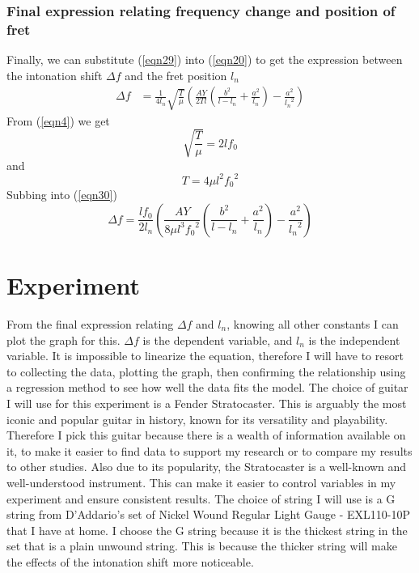 \documentclass[11pt]{article}
\begin{document}
\begin{flushleft}
            \subsubsection*{Final expression relating frequency change and position of fret}
                Finally, we can substitute (\ref{eqn29}) into (\ref{eqn20}) to get the expression between the intonation shift $\Delta f$ and the fret position $l_n$
                \begin{align}
                    \Delta f &= \frac{1}{4l_n} \sqrt{\frac{T}{\mu}} \left( \frac{AY}{2Tl} \left( \frac{b^2}{l-l_n} + \frac{a^2}{l_n} \right) - \frac{a^2}{{l_n}^2} \right) \label{eqn30}
                \end{align}
                From (\ref{eqn4}) we get
                \begin{equation*}
                    \sqrt{\frac{T}{\mu}} = 2lf_0
                \end{equation*}
                and 
                \begin{equation*}
                    T = 4\mu l^2{f_0}^2    
                \end{equation*}
                Subbing into (\ref{eqn30})
                \begin{equation}
                    \Delta f = \frac{l f_0}{2l_n} \left( \frac{AY}{8\mu l^3 {f_0}^2} \left( \frac{b^2}{l-l_n} + \frac{a^2}{l_n} \right) - \frac{a^2}{{l_n}^2} \right) \label{eqn31}
                \end{equation}
                

    \section{Experiment}
        From the final expression relating $\Delta f$ and $l_n$, knowing all other constants I can plot the graph for this. $\Delta f$ is the dependent variable, and $l_n$ is the independent variable. It is impossible to linearize the equation, therefore I will have to resort to collecting the data, plotting the graph, then confirming the relationship using a regression method to see how well the data fits the model. 
        The choice of guitar I will use for this experiment is a Fender Stratocaster. This is arguably the most iconic and popular guitar in history, known for its versatility and playability. Therefore I pick this guitar because there is a wealth of information available on it, to make it easier to find data to support my research or to compare my results to other studies. Also due to its popularity, the Stratocaster is a well-known and well-understood instrument. This can make it easier to control variables in my experiment and ensure consistent results.
        The choice of string I will use is a G string from D'Addario's set of Nickel Wound Regular Light Gauge - EXL110-10P that I have at home. I choose the G string because it is the thickest string in the set that is a plain unwound string. This is because the thicker string will make the effects of the intonation shift more noticeable. %

\end{flushleft}
\end{document}
